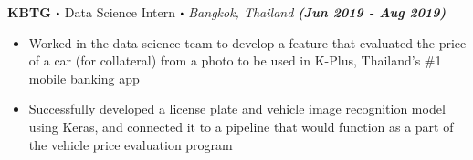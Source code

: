 \documentclass[10pt]{article}
\newcommand\sbullet[1][.5]{\mathbin{\vcenter{\hbox{\scalebox{#1}{$\bullet$}}}}}
\begin{document}
  \textbf{\large KBTG $\sbullet$} {\large Data Science Intern $\sbullet$ \textit{Bangkok, Thailand} \hfill \textit{\textbf{(Jun 2019 - Aug 2019)}}}

  \vspace*{-0.2cm}
  \begin{itemize}
    \itemsep-0.4em
    \item \textcolor{lighterG}{Worked in the data science team to develop a feature that evaluated the price of a car (for collateral) from a photo to be used in K-Plus, Thailand's \#1 mobile banking app}
    \item \textcolor{lighterG}{Successfully developed a license plate and vehicle image recognition model using Keras, and connected it to a pipeline that would function as a part of the vehicle price evaluation program}
  \end{itemize}
\end{document}
